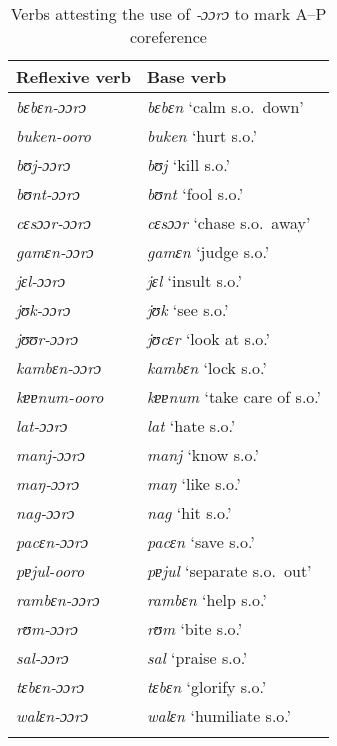 \documentclass[output=paper]{langscibook}
\begin{document}
\begin{table}[ht]
  \centering
  \begin{tabular}{ll}
    \lsptoprule
  {Reflexive verb} & {Base verb} \\
    \hline
    \textit{bɛbɛn-ɔɔrɔ} & \textit{bɛbɛn} `calm s.o.\ down' \\
    \textit{buken-ooro} & \textit{buken} `hurt s.o.' \\
    \textit{bʊj-ɔɔrɔ} & \textit{bʊj} `kill s.o.' \\
    \textit{bʊnt-ɔɔrɔ} & \textit{bʊnt} `fool s.o.' \\
    \textit{cɛsɔɔr-ɔɔrɔ} & \textit{cεsɔɔr} `chase s.o.\ away' \\
    \textit{gamɛn-ɔɔrɔ} & \textit{gamɛn} `judge s.o.' \\
    \textit{jɛl-ɔɔrɔ} & \textit{jɛl} `insult s.o.' \\
    \textit{jʊk-ɔɔrɔ} & \textit{jʊk} `see s.o.' \\
    \textit{jʊʊr-ɔɔrɔ} & \textit{jʊcɛr} `look at s.o.' \\
    \textit{kambɛn-ɔɔrɔ} & \textit{kambɛn} `lock s.o.' \\
    \textit{kɐɐnum-ooro} & \textit{kɐɐnum} `take care of s.o.' \\
    \textit{lat-ɔɔrɔ} & \textit{lat} `hate s.o.' \\
    \textit{manj-ɔɔrɔ} & \textit{manj} `know s.o.' \\
    \textit{maŋ-ɔɔrɔ} & \textit{maŋ} `like s.o.' \\
    \textit{nag-ɔɔrɔ} & \textit{nag} `hit s.o.' \\
    \textit{pacɛn-ɔɔrɔ} & \textit{pacεn} `save s.o.' \\
    \textit{pɐjul-ooro} & \textit{pɐjul} `separate s.o.\ out' \\
    \textit{rambɛn-ɔɔrɔ} & \textit{rambɛn} `help s.o.' \\
    \textit{rʊm-ɔɔrɔ} & \textit{rʊm} `bite s.o.' \\
    \textit{sal-ɔɔrɔ} & \textit{sal} `praise s.o.' \\
    \textit{tɛbɛn-ɔɔrɔ} & \textit{tεbεn} `glorify s.o.' \\
    \textit{walɛn-ɔɔrɔ} & \textit{walεn} `humiliate s.o.' \\
    \lspbottomrule
  \end{tabular}
  \caption{Verbs attesting the use of \textit{‑ɔɔrɔ} to mark A--P coreference}%
  \label{tab:Creissels:ooro-ap}
\end{table}
\end{document}

